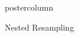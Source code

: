 \documentclass{beamer}
\begin{document}
\begin{frame}[fragile]{}
\begin{columns}
\begin{column}{.31\textwidth}
\begin{beamercolorbox}[center]{postercolumn}
\begin{minipage}{.98\textwidth}
{\begin{myblock}{Nested Resampling}
\end{myblock}

			  }
			\end{minipage}
		\end{beamercolorbox}
	\end{column}
\end{columns}

\end{frame}
\end{document}
